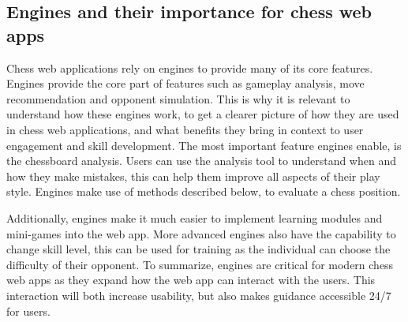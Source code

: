 \subsection{Engines and their importance for chess web apps}\label{subsec:webapps-engines}

Chess web applications rely on engines to provide many of its core features.
Engines provide the core part of features such as gameplay analysis,
move recommendation and opponent simulation.
This is why it is relevant to understand how these engines work,
to get a clearer picture of how they are used in chess web applications,
and what benefits they bring in context to user engagement and skill
development.
The most important feature engines enable, is the chessboard analysis.
Users can use the analysis tool to understand when and how they make mistakes,
this can help them improve all aspects of their play style.
Engines make use of methods described below, to evaluate a chess position.

Additionally, engines make it much easier to implement learning modules
and mini-games into the web app.
More advanced engines also have the capability to change skill level,
this can be used for training as the individual can choose the difficulty of
their opponent.
To summarize, engines are critical for modern chess web apps as they
expand how the web app can interact with the users.
This interaction will both increase usability, but also makes guidance accessible
24/7 for users.

